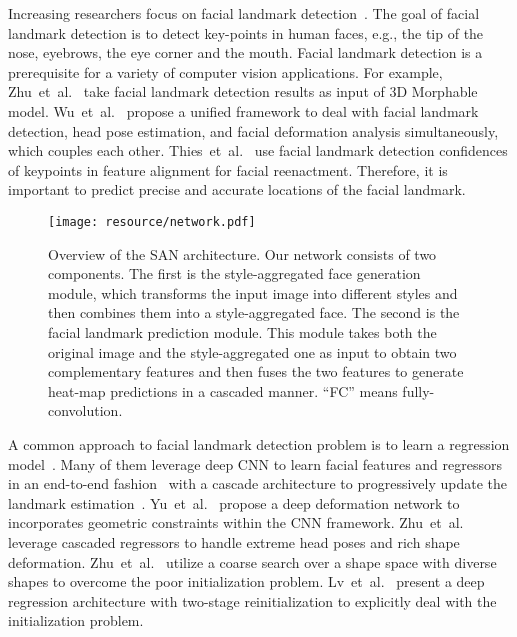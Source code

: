 \documentclass[10pt,twocolumn,letterpaper]{article}
\begin{document}
Increasing researchers focus on facial landmark detection~\cite{sagonas2013300}.
The goal of facial landmark detection is to detect key-points in human faces, e.g., the tip of the nose, eyebrows, the eye corner and the mouth.
Facial landmark detection is a prerequisite for a variety of computer vision applications.
For example, Zhu~et~al.~\cite{zhucvpr2015high} take facial landmark detection results as input of 3D Morphable model.
Wu~et~al.~\cite{wucvpr2017simultaneous} propose a unified framework to deal with facial landmark detection, head pose estimation, and facial deformation analysis simultaneously, which couples each other.
Thies~et~al.~\cite{thies2016face2face} use facial landmark detection confidences of keypoints in feature alignment for facial reenactment.
Therefore, it is important to predict precise and accurate locations of the facial landmark.



\begin{figure*}[t]
\center
\texttt{[image: resource/network.pdf]}
\caption{
Overview of the SAN architecture.
Our network consists of two components.
The first is the style-aggregated face generation module, which transforms the input image into different styles and then combines them into a style-aggregated face.
The second is the facial landmark prediction module.
This module takes both the original image and the style-aggregated one as input to obtain two complementary features and then fuses the two features to generate heat-map predictions in a cascaded manner. ``FC'' means fully-convolution.
}
\label{fig:network}
\end{figure*}



A common approach to facial landmark detection problem is to learn a regression model~\cite{lv2017deep,xiong2013supervised,zhu2012face,bulat2017binarized,zhu2016unconstrained,cao2014face,xing2014towards}.
Many of them leverage deep CNN to learn facial features and regressors in an end-to-end fashion~\cite{sun2013deep,lv2017deep,zhu2016unconstrained}
with a cascade architecture to progressively update the landmark estimation~\cite{zhu2016unconstrained,sun2013deep,dollar2010cascaded}.
Yu~et~al.~\cite{yu2016deep} propose a deep deformation network to incorporates geometric constraints within the CNN framework.
Zhu~et~al.~\cite{zhu2016unconstrained} leverage cascaded regressors to handle extreme head poses and rich shape deformation.
Zhu~et~al.~\cite{zhu2015face} utilize a coarse search over a shape space with diverse shapes to overcome the poor initialization problem.
Lv~et~al.~\cite{lv2017deep} present a deep regression architecture with two-stage reinitialization to explicitly deal with the initialization problem.
\end{document}

